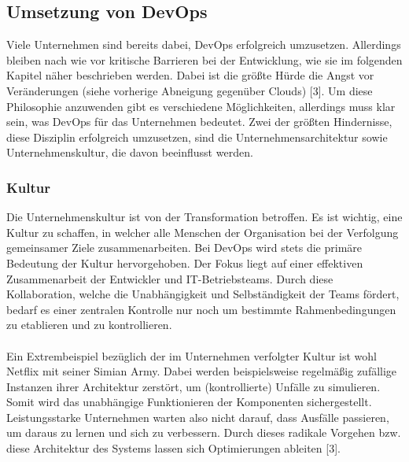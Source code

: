 \subsection{Umsetzung von DevOps}
Viele Unternehmen sind bereits dabei, DevOps erfolgreich umzusetzen. Allerdings bleiben nach wie vor kritische Barrieren bei der Entwicklung, wie sie im folgenden Kapitel näher beschrieben werden. Dabei ist die größte Hürde die Angst vor Veränderungen (siehe vorherige Abneigung gegenüber Clouds) [3]. Um diese Philosophie anzuwenden gibt es verschiedene Möglichkeiten, allerdings muss klar sein, was DevOps für das Unternehmen bedeutet. Zwei der größten Hindernisse, diese Disziplin erfolgreich umzusetzen, sind die Unternehmensarchitektur sowie Unternehmenskultur, die davon beeinflusst werden.

\subsubsection{Kultur}
Die Unternehmenskultur ist von der Transformation betroffen. Es ist wichtig, eine Kultur zu schaffen, in welcher alle Menschen der Organisation bei der Verfolgung gemeinsamer Ziele zusammenarbeiten. Bei DevOps wird stets die primäre Bedeutung der Kultur hervorgehoben. Der Fokus liegt auf einer effektiven Zusammenarbeit der Entwickler und IT-Betriebsteams. Durch diese Kollaboration, welche die Unabhängigkeit und Selbständigkeit der Teams fördert, bedarf es einer zentralen Kontrolle nur noch um bestimmte Rahmenbedingungen zu etablieren und zu kontrollieren.\\ \\    
Ein Extrembeispiel bezüglich der im Unternehmen verfolgter Kultur ist wohl Netflix mit seiner Simian Army. Dabei werden beispielsweise regelmäßig zufällige Instanzen ihrer Architektur zerstört, um (kontrollierte) Unfälle zu simulieren. Somit wird das unabhängige Funktionieren der Komponenten sichergestellt. Leistungsstarke Unternehmen warten also nicht darauf, dass Ausfälle passieren, um daraus zu lernen und sich zu verbessern. Durch dieses radikale Vorgehen bzw. diese Architektur des Systems lassen sich Optimierungen ableiten [3].

